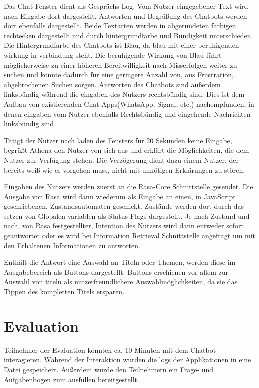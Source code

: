 \documentclass[12pt,a4paper]{article}
\begin{document}
Das Chat-Fenster dient als Gesprächs-Log.
Vom Nutzer eingegebener Text wird nach Eingabe dort dargestellt.
Antworten und Begrüßung des Chatbots werden dort ebenfalls dargestellt.
Beide Textarten werden in abgerundeten farbigen rechtecken dargestellt und durch hintergrundfarbe und Bündigkeit unterschieden.
Die Hintergrundfarbe des Chatbots ist Blau, da blau mit einer beruhigenden wirkung in verbindung steht. \cite{Singh2006}
Die beruhigende Wirkung von Blau führt möglicherweise zu einer höheren Bereitwilligkeit nach Misserfolgen weiter zu suchen und könnte dadurch für eine geringere Anzahl von, aus Frustration, abgebrochenen Suchen sorgen.
Antworten des Chatbots sind außerdem linksbündig während die eingaben des Nutzers rechtsbündig sind.
Dies ist dem Aufbau von existierenden Chat-Apps(WhatsApp, Signal, etc.) nachempfunden, in denen eingaben vom Nutzer ebenfalls Rechtsbündig und eingehende Nachrichten linksbündig sind.

Tätigt der Nutzer nach laden des Fensters für 20 Sekunden keine Eingabe, begrüßt Athena den Nutzer von sich aus und erklärt die Möglichkeiten, die dem Nutzer zur Verfügung stehen.
Die Verzögerung dient dazu einem Nutzer, der bereits weiß wie er vorgehen muss, nicht mit unnötigen Erklärungen zu stören.

Eingaben des Nutzers werden zuerst an die Rasa-Core Schnittstelle gesendet.
Die Ausgabe von Rasa wird dann wiederum als Eingabe an einen, in JavaScript geschriebenen, Zustandsautomaten geschickt.
Zustände werden dort durch das setzen von Globalen variablen als Status-Flags dargestellt.
Je nach Zustand und nach, von Rasa festgestellter, Intention des Nutzers wird dann entweder sofort geantwortet oder es wird bei Information Retrieval Schnittstelle angefragt um mit den Erhaltenen Informationen zu antworten.

Enthält die Antwort eine Auswahl an Titeln oder Themen, werden diese im Ausgabebereich als Buttons dargestellt.
Buttons erschienen vor allem zur Auswahl von titeln als nutzerfreundlichere Auswahlmöglichkeiten, da sie das Tippen des kompletten Titels ersparen.

\section{Evaluation}

Teilnehmer der Evaluation konnten ca. 10 Minuten mit dem Chatbot interagieren.
Während der Interaktion wurden die logs der Applikationen in eine Datei gespeichert.
Außerdem wurde den Teilnehmern ein Frage- und Aufgabenbogen zum ausfüllen bereitgestellt.
\end{document}
